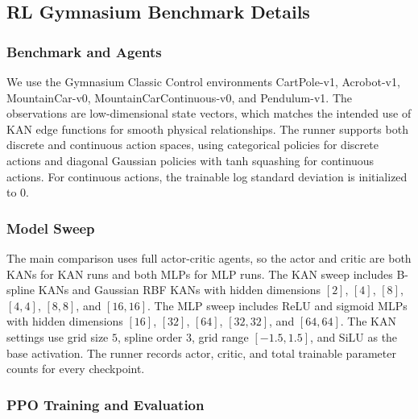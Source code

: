 \documentclass{article}
\begin{document}
\subsection{RL Gymnasium Benchmark Details}

\subsubsection{Benchmark and Agents}

We use the Gymnasium Classic Control environments CartPole-v1, Acrobot-v1, MountainCar-v0, MountainCarContinuous-v0, and Pendulum-v1.
The observations are low-dimensional state vectors, which matches the intended use of KAN edge functions for smooth physical relationships.
The runner supports both discrete and continuous action spaces, using categorical policies for discrete actions and diagonal Gaussian policies with tanh squashing for continuous actions.
For continuous actions, the trainable log standard deviation is initialized to $0$.

\subsubsection{Model Sweep}

The main comparison uses full actor-critic agents, so the actor and critic are both KANs for KAN runs and both MLPs for MLP runs.
The KAN sweep includes B-spline KANs and Gaussian RBF KANs with hidden dimensions $[2]$, $[4]$, $[8]$, $[4,4]$, $[8,8]$, and $[16,16]$.
The MLP sweep includes ReLU and sigmoid MLPs with hidden dimensions $[16]$, $[32]$, $[64]$, $[32,32]$, and $[64,64]$.
The KAN settings use grid size $5$, spline order $3$, grid range $[-1.5,1.5]$, and SiLU as the base activation.
The runner records actor, critic, and total trainable parameter counts for every checkpoint.

\subsubsection{PPO Training and Evaluation}
\end{document}
